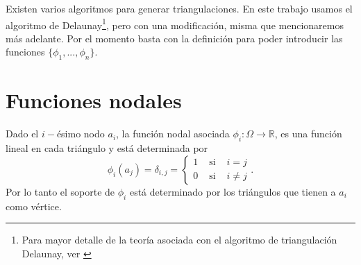 \documentclass[12pt,spanish,oneside]{book}
\theoremstyle{plain}
\numberwithin{equation}{chapter}
\theoremstyle{definition}
\theoremstyle{remark}
\newcommand{\re}{\mathbb{R}}
\begin{document}
Existen varios algoritmos para generar triangulaciones. En este trabajo usamos el algoritmo de Delaunay\footnote{Para mayor detalle de la teoría asociada con el algoritmo de triangulación Delaunay, ver \cite{geobook} }, pero con una modificación, misma que mencionaremos más adelante. Por el momento basta con la definición para poder introducir las funciones $\lbrace \phi_1,...,\phi_n \rbrace$. 

\section{Funciones nodales}\label{Sfn}


Dado el $i-$ésimo nodo $a_i$, la función nodal asociada $\phi_i : \Omega \rightarrow \re$, es una función lineal en cada triángulo y está determinada por \[\phi_i(a_j)=\delta_{i,j}= \left \lbrace \begin{array}{ccc} 1 &\text{ si } & i=j \\ 0 & \text{ si }& i\neq j\end{array}\right. .\] Por lo tanto el soporte de $\phi_i$ está determinado por los triángulos que tienen a $a_i$ como vértice.
% 
% 
%  
\end{document}

